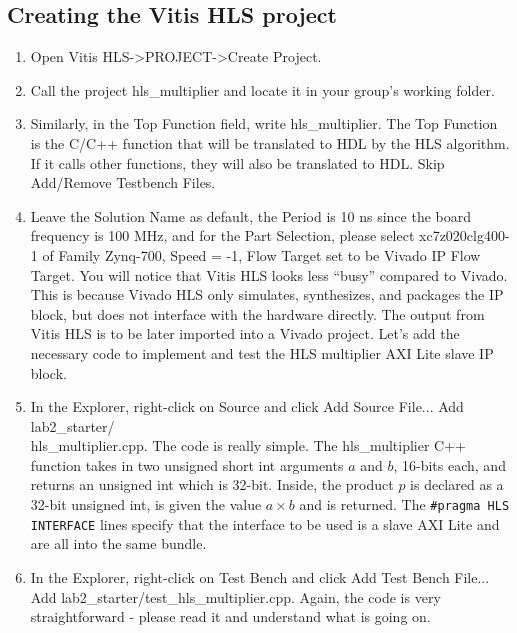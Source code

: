 \documentclass[a4paper,12pt,twoside]{article}
\begin{document}
\subsection{Creating the Vitis HLS project}
\begin{enumerate}
    \item Open Vitis HLS->PROJECT->Create Project.
    \item Call the project hls\_multiplier and locate it in your group’s working folder.
    \item Similarly, in the Top Function field, write hls\_multiplier. The Top Function is the C/C++ function that will be translated to HDL by the HLS algorithm. If it calls other functions, they will also be translated to HDL. Skip Add/Remove Testbench Files.
    \item Leave the Solution Name as default, the Period is 10 ns since the board frequency is 100 MHz, and for the Part Selection, please select xc7z020clg400-1 of Family Zynq-700, Speed = -1, Flow Target set to be Vivado IP Flow Target. You will notice that Vitis HLS looks less “busy” compared to Vivado. This is because Vivado HLS only simulates, synthesizes, and packages the IP block, but does not interface with the hardware directly. The output from Vitis HLS is to be later imported into a Vivado project. Let's add the necessary code to implement and test the HLS multiplier AXI Lite slave IP block.
    \item In the Explorer, right-click on Source and click Add Source File... Add lab2\_starter/\\
    hls\_multiplier.cpp. The code is really simple. The hls\_multiplier C++ function takes in two unsigned short int arguments $a$ and $b$, 16-bits each, and returns an unsigned int which is 32-bit. Inside, the product $p$ is declared as a 32-bit unsigned int, is given the value $a\times b$ and is returned. The \texttt{\#pragma HLS INTERFACE} lines specify that the interface to be used is a slave AXI Lite and are all into the same bundle.
    \item In the Explorer, right-click on Test Bench and click Add Test Bench File... Add lab2\_starter/test\_hls\_multiplier.cpp. Again, the code is very straightforward - please read it and understand what is going on.
\end{enumerate}
\end{document}
